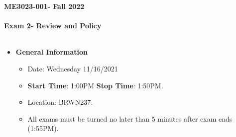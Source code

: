 \documentclass[11pt]{article}
\newcommand{\EXAMNUM}{2\hspace{0mm}}
\newcommand{\SECNUM}{001\hspace{0mm}}
\begin{document}
\textbf{ \LARGE ME3023-\SECNUM - Fall 2022} \\\\
\textbf{ \LARGE \hspace*{5mm} Exam \EXAMNUM \hspace{2mm}- Review and Policy  } \\\\

\begin{itemize}
	\item  \textbf{\Large General Information}

	\begin{itemize}

		\item Date: Wednesday 11/16/2021
		\item {\bf Start Time}: 1:00PM {\bf Stop Time}: 1:50PM.
		\item Location: BRWN237. 
		 
		\item All exams must be turned no later than 5 minutes after exam ends (1:55PM). \vspace{1mm}\\
		
	\end{itemize}


\end{itemize}
\end{document}
